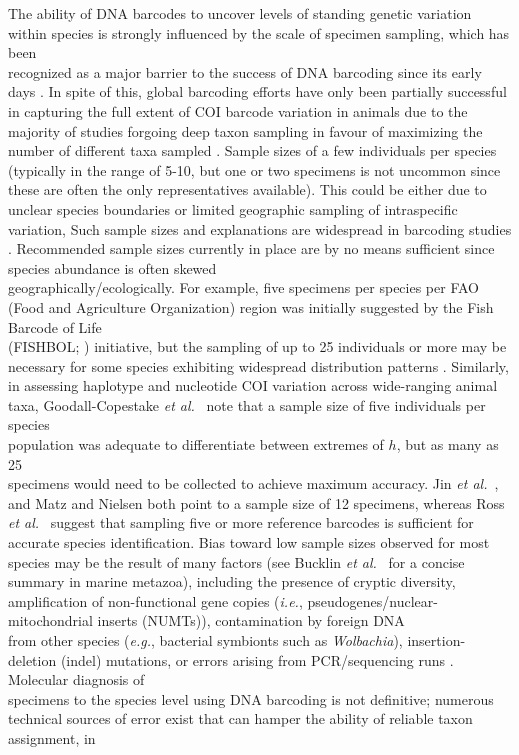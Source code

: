 The ability of DNA barcodes to uncover levels of standing genetic variation within species is strongly influenced by the scale of specimen sampling, which has been \\ recognized as a major barrier to the success of DNA barcoding since its early days  \cite{hebert2004identification, meyer2005dna, ward2005dna}. In spite of this, global barcoding efforts have only been partially successful in capturing the full extent of COI barcode variation in animals due to the majority of studies forgoing deep taxon sampling in favour of maximizing the number of different taxa sampled \cite{matz2005likelihood, zhang2010estimating}. Sample sizes of a few individuals per species (typically in the range of 5-10, but one or two specimens is not uncommon since these are often the only representatives available). This could be either due to unclear species boundaries  or limited geographic sampling of intraspecific variation, Such sample sizes and explanations are widespread in barcoding studies \cite{hajibabaei2007dna, matz2005likelihood, zhang2010estimating}. Recommended sample sizes currently in place are by no means sufficient since species abundance is often skewed \\ geographically/ecologically. For example, five specimens per species per FAO (Food and Agriculture Organization) region was initially suggested by the Fish Barcode of Life \\ (FISHBOL; \cite{ward2009campaign}) initiative, but the sampling of up to 25 individuals or more may be necessary for some species exhibiting widespread distribution patterns \cite{becker2011five, steinke2011fish}. Similarly, in assessing haplotype and nucleotide COI variation across wide-ranging animal taxa, Goodall-Copestake \textit{et al.}~\cite{goodall2012comparison} note that a sample size of five individuals per species \\ population was adequate to differentiate between extremes of $h$, but as many as 25 \\ specimens would need to be collected to achieve maximum accuracy. Jin \textit{et al.}~\cite{jin2012simple}, and Matz and Nielsen \cite{matz2005likelihood} both point to a sample size of 12 specimens, whereas Ross \textit{et al.}~\cite{ross2008testing} suggest that sampling five or more reference barcodes is sufficient for accurate species identification. Bias toward low sample sizes observed for most species may be the result of many factors (see Bucklin \textit{et al.}~\cite{bucklin2011dna} for a concise summary in marine metazoa), including the presence of cryptic diversity, amplification of non-functional gene copies (\textit{i.e.}, pseudogenes/nuclear-mitochondrial inserts (NUMTs)), contamination by foreign DNA \\ from other species (\textit{e.g.}, bacterial symbionts such as \textit{Wolbachia}), insertion-deletion (indel) mutations, or errors arising from PCR/sequencing runs \cite{goodall2012comparison}.  Molecular diagnosis of \\ specimens to the species level using DNA barcoding is not  definitive; numerous technical sources of error exist that can hamper the ability of reliable taxon assignment, in 